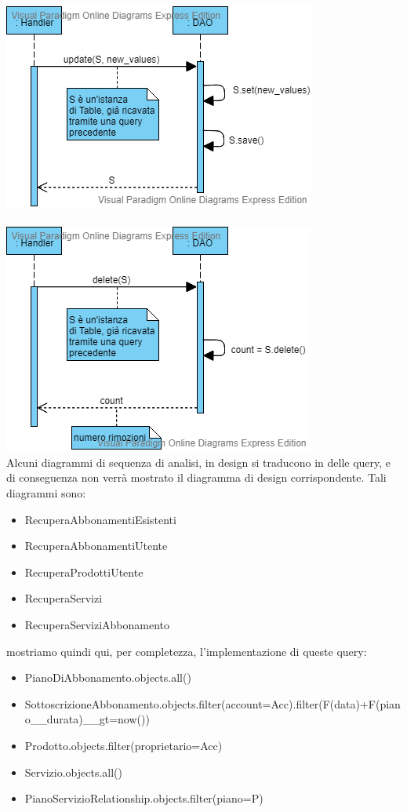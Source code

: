 \includegraphics[scale=0.7]{../Contents/Diagrams/Design/sequence/DAO/update.png}\\ \\
\includegraphics[scale=0.7]{../Contents/Diagrams/Design/sequence/DAO/delete.png}\\
Alcuni diagrammi di sequenza di analisi, in design si traducono in delle query, e di conseguenza non verrà mostrato il diagramma di design corrispondente. Tali diagrammi sono:
\begin{itemize}
\item RecuperaAbbonamentiEsistenti
\item RecuperaAbbonamentiUtente
\item RecuperaProdottiUtente
\item RecuperaServizi
\item RecuperaServiziAbbonamento
\end{itemize}
mostriamo quindi qui, per completezza, l'implementazione di queste query:
\begin{itemize}
\item PianoDiAbbonamento.objects.all()
\item SottoscrizioneAbbonamento.objects.filter(account=Acc).filter(F(data)+F(piano\_\_durata)\_\_gt=now())
\item Prodotto.objects.filter(proprietario=Acc)
\item Servizio.objects.all()
\item PianoServizioRelationship.objects.filter(piano=P)
\end{itemize}

